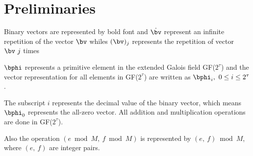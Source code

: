 \section{Preliminaries}
\label{sec2}
Binary vectors are represented by bold font and $\dot{\bv}$ represent an infinite repetition of the vector $\bv$ whiles $(\bv)_j$ represents the repetition of vector $\bv~j$ times   

$\bphi$ represents a primitive element in the extended Galois field GF($2^{\tau}$) and the vector representation for all elements in GF($2^{\tau}$) are written as $\bphi_i,~0 \leq i \leq 2^{\tau}$. 

The subscript $i$ represents the decimal value of the binary vector, which means $\bphi_0$ represents the all-zero vector. All addition and multiplication operations are done in GF($2^{\tau}$).

Also the operation $(e \bmod M,~f \bmod M)$ is represented by $(e,~f) \bmod M$, where $(e,~f)$ are integer pairs.
